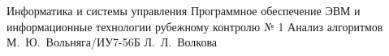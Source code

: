 \documentclass{bmstu}
\begin{document}
	\makereporttitle
		{Информатика и системы управления} %
		{Программное обеспечение ЭВМ и информационные технологии} %
		{рубежному контролю № 1} %
		{Анализ алгоритмов} %
		{ } %
		{} %
		{М.~Ю.~Вольняга/ИУ7-56Б} %
		{Л.~Л.~Волкова} %
	
	\maketableofcontents
	
	
	
	
	
	
	
	
	
	\makebibliography
\end{document}
